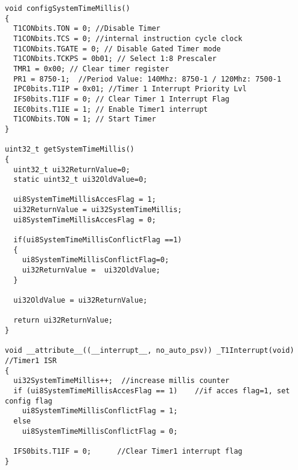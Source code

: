 \newpage
\begin{lstlisting}[frame=htrbl, caption={System Time Funktionen}, label={lst:SysTimeFunctions}]
void configSystemTimeMillis()
{
  T1CONbits.TON = 0; //Disable Timer
  T1CONbits.TCS = 0; //internal instruction cycle clock
  T1CONbits.TGATE = 0; // Disable Gated Timer mode
  T1CONbits.TCKPS = 0b01; // Select 1:8 Prescaler
  TMR1 = 0x00; // Clear timer register
  PR1 = 8750-1;  //Period Value: 140Mhz: 8750-1 / 120Mhz: 7500-1
  IPC0bits.T1IP = 0x01; //Timer 1 Interrupt Priority Lvl
  IFS0bits.T1IF = 0; // Clear Timer 1 Interrupt Flag
  IEC0bits.T1IE = 1; // Enable Timer1 interrupt
  T1CONbits.TON = 1; // Start Timer
}

uint32_t getSystemTimeMillis()
{
  uint32_t ui32ReturnValue=0;
  static uint32_t ui32OldValue=0; 
	
  ui8SystemTimeMillisAccesFlag = 1;
  ui32ReturnValue = ui32SystemTimeMillis;
  ui8SystemTimeMillisAccesFlag = 0;
	
  if(ui8SystemTimeMillisConflictFlag ==1)
  {
	ui8SystemTimeMillisConflictFlag=0;
	ui32ReturnValue =  ui32OldValue;
  }

  ui32OldValue = ui32ReturnValue;

  return ui32ReturnValue;
}

void __attribute__((__interrupt__, no_auto_psv)) _T1Interrupt(void) //Timer1 ISR
{
  ui32SystemTimeMillis++;  //increase millis counter
  if (ui8SystemTimeMillisAccesFlag == 1)    //if acces flag=1, set config flag
	ui8SystemTimeMillisConflictFlag = 1;
  else
	ui8SystemTimeMillisConflictFlag = 0;
	
  IFS0bits.T1IF = 0;      //Clear Timer1 interrupt flag
}
\end{lstlisting}


